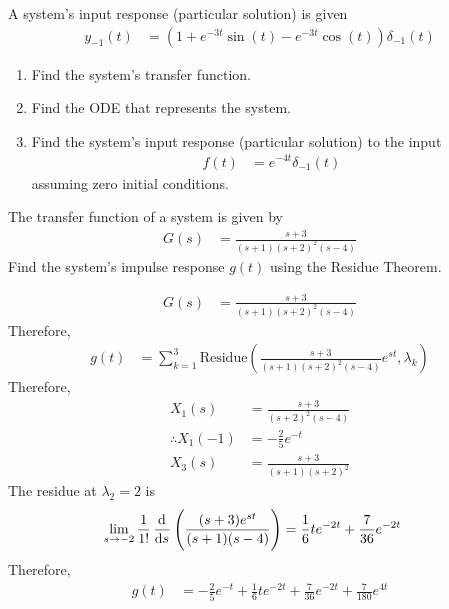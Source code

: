 \documentclass[fleqn, a4paper, 11pt, oneside]{amsart}
\theoremstyle{definition}
\theoremstyle{theorem}
\begin{document}
\begin{question}
	A system's input response (particular solution) is given
	\begin{align*}
		y_{-1}(t) & = \left( 1 + e^{-3 t} \sin(t) - e^{-3 t} \cos(t) \right) \delta_{-1}(t)
	\end{align*}
	\begin{enumerate}
		\item
			Find the system's transfer function.
		\item
			Find the ODE that represents the system.
		\item
			Find the system's input response (particular solution) to the input
			\begin{align*}
				f(t) & = e^{-4 t} \delta_{-1}(t)
			\end{align*}
			assuming zero initial conditions.
	\end{enumerate}
\end{question}

\begin{question}
	The transfer function of a system is given by
	\begin{align*}
		G(s) & = \frac{s + 3}{(s + 1) (s + 2)^2 (s - 4)}
	\end{align*}
	Find the system's impulse response $g(t)$ using the Residue Theorem.
\end{question}

\begin{solution}
	\begin{align*}
		G(s) & = \frac{s + 3}{(s + 1) (s + 2)^2 (s - 4)}
	\end{align*}
	Therefore,
	\begin{align*}
		g(t) & = \sum\limits_{k = 1}^{3} \textrm{Residue}\left( \frac{s + 3}{(s + 1) (s + 2)^2 (s - 4)} e^{s t} , \lambda_k \right)
	\end{align*}
	Therefore,
	\begin{align*}
		X_1(s)             & = \frac{s + 3}{(s + 2)^2 (s - 4)} \\
		\therefore X_1(-1) & = -\frac{2}{5} e^{-t}             \\
		X_3(s)             & = \frac{s + 3}{(s + 1) (s + 2)^2}
	\end{align*}
	The residue at $\lambda_2 = 2$ is
	\begin{align*}
		\lim\limits_{s \to -2} \frac{1}{1!} \dod{}{s}\left( \frac{(s + 3) e^{s t}}{(s + 1) (s - 4)} \right) & = \frac{1}{6} t e^{-2 t} + \frac{7}{36} e^{-2 t}
	\end{align*}
	Therefore,
	\begin{align*}
		g(t) & = -\frac{2}{5} e^{-t} + \frac{1}{6} t e^{-2 t} + \frac{7}{36} e^{-2 t} + \frac{7}{180} e^{4 t}
	\end{align*}
\end{solution}
\end{document}
